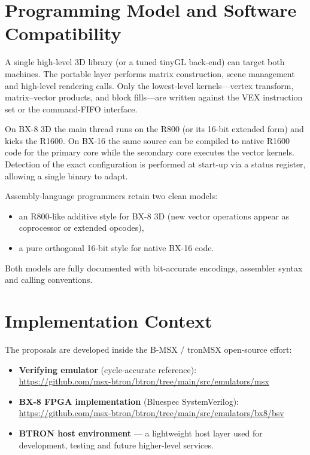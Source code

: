 \documentclass[11pt,a4paper]{article}
\begin{document}
\section{Programming Model and Software Compatibility}

A single high-level 3D library (or a tuned tinyGL back-end) can target both machines. The portable layer performs matrix construction, scene management and high-level rendering calls. Only the lowest-level kernels---vertex transform, matrix--vector products, and block fills---are written against the VEX instruction set or the command-FIFO interface.

On BX-8 3D the main thread runs on the R800 (or its 16-bit extended form) and kicks the R1600. On BX-16 the same source can be compiled to native R1600 code for the primary core while the secondary core executes the vector kernels. Detection of the exact configuration is performed at start-up via a status register, allowing a single binary to adapt.

Assembly-language programmers retain two clean models:

\begin{itemize}
    \item an R800-like additive style for BX-8 3D (new vector operations appear as coprocessor or extended opcodes),
    \item a pure orthogonal 16-bit style for native BX-16 code.
\end{itemize}

Both models are fully documented with bit-accurate encodings, assembler syntax and calling conventions.

\section{Implementation Context}

The proposals are developed inside the B-MSX / tronMSX open-source effort:

\begin{itemize}
    \item \textbf{Verifying emulator} (cycle-accurate reference):\\
    \url{https://github.com/msx-btron/btron/tree/main/src/emulators/msx}
    \item \textbf{BX-8 FPGA implementation} (Bluespec SystemVerilog):\\
    \url{https://github.com/msx-btron/btron/tree/main/src/emulators/bx8/bsv}
    \item \textbf{BTRON host environment} --- a lightweight host layer used for development, testing and future higher-level services.
\end{itemize}
\end{document}
